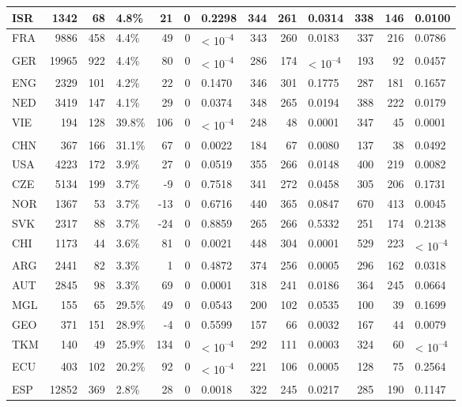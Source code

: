 \begin{tabular}{l|r|r|l|r|r|l|r|r|l|r|r|l}
ISR & 1342 & 68 & 4.8\% & 21 & 0 & 0.2298 & 344 & 261 & 0.0314 & 338 & 146 & 0.0100\\
\hline
FRA & 9886 & 458 & 4.4\% & 49 & 0 & < 10\textsuperscript{--4} & 343 & 260 & 0.0183 & 337 & 216 & 0.0786\\
\hline
GER & 19965 & 922 & 4.4\% & 80 & 0 & < 10\textsuperscript{--4} & 286 & 174 & < 10\textsuperscript{--4} & 193 & 92 & 0.0457\\
\hline
ENG & 2329 & 101 & 4.2\% & 22 & 0 & 0.1470 & 346 & 301 & 0.1775 & 287 & 181 & 0.1657\\
\hline
NED & 3419 & 147 & 4.1\% & 29 & 0 & 0.0374 & 348 & 265 & 0.0194 & 388 & 222 & 0.0179\\
\hline
VIE & 194 & 128 & 39.8\% & 106 & 0 & < 10\textsuperscript{--4} & 248 & 48 & 0.0001 & 347 & 45 & 0.0001\\
\hline
CHN & 367 & 166 & 31.1\% & 67 & 0 & 0.0022 & 184 & 67 & 0.0080 & 137 & 38 & 0.0492\\
\hline
USA & 4223 & 172 & 3.9\% & 27 & 0 & 0.0519 & 355 & 266 & 0.0148 & 400 & 219 & 0.0082\\
\hline
CZE & 5134 & 199 & 3.7\% & -9 & 0 & 0.7518 & 341 & 272 & 0.0458 & 305 & 206 & 0.1731\\
\hline
NOR & 1367 & 53 & 3.7\% & -13 & 0 & 0.6716 & 440 & 365 & 0.0847 & 670 & 413 & 0.0045\\
\hline
SVK & 2317 & 88 & 3.7\% & -24 & 0 & 0.8859 & 265 & 266 & 0.5332 & 251 & 174 & 0.2138\\
\hline
CHI & 1173 & 44 & 3.6\% & 81 & 0 & 0.0021 & 448 & 304 & 0.0001 & 529 & 223 & < 10\textsuperscript{--4}\\
\hline
ARG & 2441 & 82 & 3.3\% & 1 & 0 & 0.4872 & 374 & 256 & 0.0005 & 296 & 162 & 0.0318\\
\hline
AUT & 2845 & 98 & 3.3\% & 69 & 0 & 0.0001 & 318 & 241 & 0.0186 & 364 & 245 & 0.0664\\
\hline
MGL & 155 & 65 & 29.5\% & 49 & 0 & 0.0543 & 200 & 102 & 0.0535 & 100 & 39 & 0.1699\\
\hline
GEO & 371 & 151 & 28.9\% & -4 & 0 & 0.5599 & 157 & 66 & 0.0032 & 167 & 44 & 0.0079\\
\hline
TKM & 140 & 49 & 25.9\% & 134 & 0 & < 10\textsuperscript{--4} & 292 & 111 & 0.0003 & 324 & 60 & < 10\textsuperscript{--4}\\
\hline
ECU & 403 & 102 & 20.2\% & 92 & 0 & < 10\textsuperscript{--4} & 221 & 106 & 0.0005 & 128 & 75 & 0.2564\\
\hline
ESP & 12852 & 369 & 2.8\% & 28 & 0 & 0.0018 & 322 & 245 & 0.0217 & 285 & 190 & 0.1147\\

\end{tabular}
